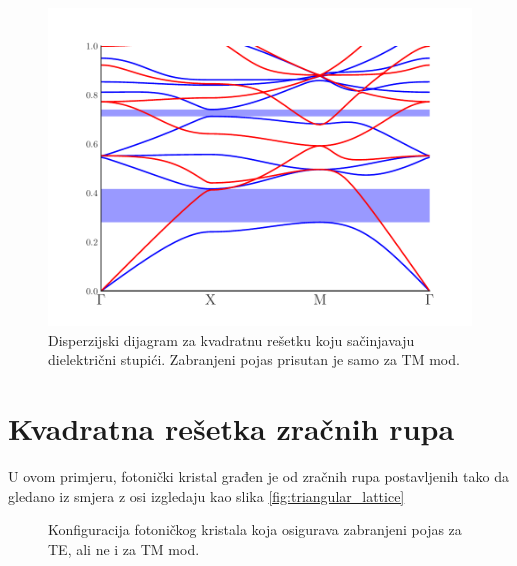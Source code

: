 \documentclass[utf8, seminar, numeric]{fer}
\begin{document}
\begin{figure}[ht]
	\centering
	\includegraphics[width = 0.8\linewidth]
		{./images/pdf/square_lattice_rods_band_diagram.pdf}
	\caption{Disperzijski dijagram za kvadratnu rešetku koju sačinjavaju
	dielektrični stupići. Zabranjeni pojas prisutan je samo za TM mod.}
	\label{fig:square_band_diagram}
\end{figure}

\FloatBarrier

\section{Kvadratna rešetka zračnih rupa} \label{sec:square_holes}

U ovom primjeru, fotonički kristal građen je od zračnih rupa
postavljenih tako da gledano iz smjera z osi izgledaju kao
slika \ref{fig:triangular_lattice}

\begin{figure}[ht]
\centering
    \qquad
	\caption{Konfiguracija fotoničkog kristala koja osigurava zabranjeni pojas
	za TE, ali ne i za TM mod.}
	\label{fig:square_lattice_holes}
\end{figure}
\end{document}
